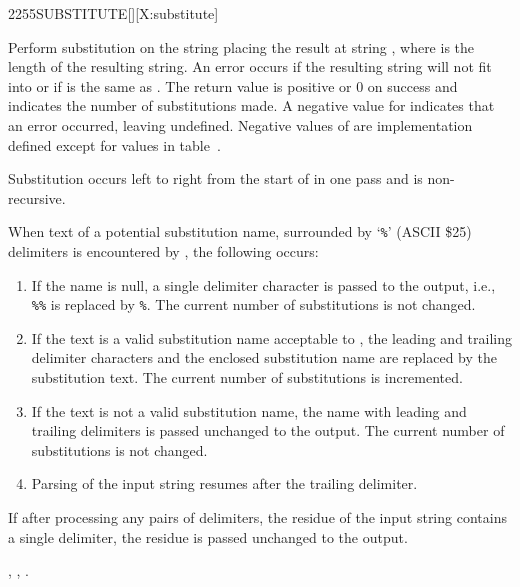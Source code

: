 \begin{worddef}{2255}{SUBSTITUTE}[][X:substitute]
\item {}

	Perform substitution on the string  placing
	the result at string , where  is
	the length of the resulting string.
	An error occurs if the resulting string will not fit into
	 or if  is the same as .
	The return value  is positive or 0 on success and indicates the
	number of substitutions made.
	A negative value for  indicates that an error occurred, leaving
	 undefined.
	Negative values of  are implementation defined except for
	values in table~.

	Substitution occurs left to right from the start of 
	in one pass and is non-recursive.

	When text of a potential substitution name, surrounded by `\texttt{\%}' (ASCII \$25) delimiters
	is encountered by , the following occurs:

	\begin{enumerate}
	\item If the name is null, a single delimiter character is passed
		to the output, i.e., \texttt{\%\%} is replaced by \texttt{\%}.
		The current number of substitutions is not changed.

	\item If the text is a valid substitution name acceptable to
		, the leading and trailing delimiter
		characters and the enclosed substitution name are replaced by
		the substitution text.  The current number of substitutions
		is incremented.

	\item If the text is not a valid substitution name, the name with
		leading	and trailing delimiters is passed unchanged to the
		output.  The current number of substitutions is not changed.

	\item Parsing of the input string resumes after the trailing delimiter.
	\end{enumerate}

	If after processing any pairs of delimiters, the residue of the input string contains
	a single delimiter, the residue is passed unchanged to the output.

\see {}, , .


\end{worddef}
